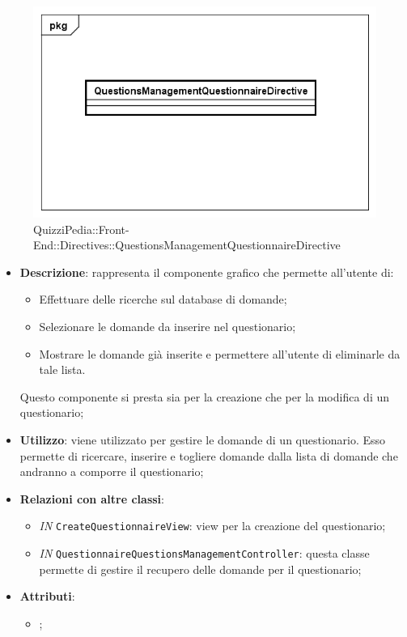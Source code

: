 \label{QuizziPedia::Front-End::Directives::QuestionsManagementQuestionnaireDirective}

\begin{figure}[ht]
	\centering
	\includegraphics[scale=0.80,keepaspectratio]{UML/Classi/Front-End/QuizziPedia_Front-end_Directives_QuestionsManagementQuestionnaireDirective.png}
	\caption{QuizziPedia::Front-End::Directives::QuestionsManagementQuestionnaireDirective}
\end{figure} 
\FloatBarrier

\begin{itemize}
	\item \textbf{Descrizione}: rappresenta il componente grafico che permette all'utente di:
		\begin{itemize}
			\item Effettuare delle ricerche sul database di domande;
			\item Selezionare le domande da inserire nel questionario;
			\item Mostrare le domande già inserite e permettere all'utente di eliminarle da tale lista.
		\end{itemize}
		Questo componente si presta sia per la creazione che per la modifica di un questionario;
	\item \textbf{Utilizzo}: viene utilizzato per gestire le domande di un questionario. Esso permette di ricercare, inserire e togliere domande dalla lista di domande che andranno a comporre il questionario;
	\item \textbf{Relazioni con altre classi}: 
	\begin{itemize}
		\item \textit{IN} \texttt{CreateQuestionnaireView}: view per la creazione del questionario;
		\item \textit{IN} \texttt{QuestionnaireQuestionsManagementController}: questa classe permette di gestire il recupero delle domande per il questionario;
	\end{itemize}
	\item \textbf{Attributi}: 
	\begin{itemize}
		\item ;
	\end{itemize}
\end{itemize}

